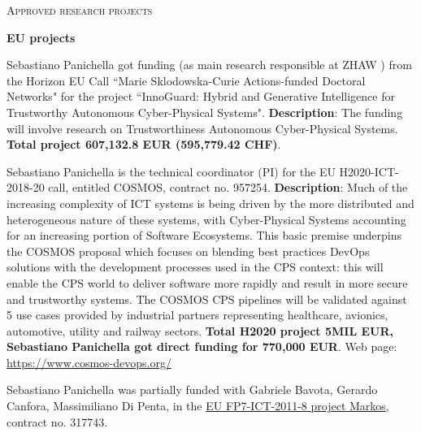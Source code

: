 \documentclass[11pt]{article}
\newcommand{\ins}[1]{\textcolor{blue}{\uline{#1}}} %
\newcommand{\ins}[1]{#1} %
\newcommand\on[1]{\nbc{ON}{#1}{red}} %
\begin{document}

\vspace{2.5mm}


\textsc{Approved research projects}
\vspace{1.5mm}


\textbf{EU projects}
\begin{innerlist}
\item 

Sebastiano Panichella got funding (as main research responsible at ZHAW ) from the Horizon EU Call ``Marie Sklodowska-Curie Actions-funded Doctoral Networks" for the project ``InnoGuard: Hybrid and Generative Intelligence for Trustworthy Autonomous Cyber-Physical Systems".
\textbf{Description}: The funding will involve research on Trustworthiness Autonomous Cyber-Physical Systems.
\textbf{Total project 607,132.8 EUR (595,779.42 CHF)}. 

\item Sebastiano Panichella is the technical coordinator (PI) for the EU H2020-ICT-2018-20 call, entitled COSMOS, contract no. 957254. \textbf{Description}: Much of the increasing complexity of ICT systems is being driven by the more distributed and heterogeneous nature of these systems, with Cyber-Physical Systems accounting for an increasing portion of Software Ecosystems. This basic premise underpins the COSMOS proposal which focuses on blending best practices DevOps solutions with the development processes used in the CPS context: this will enable the CPS world to deliver software more rapidly and result in more secure and trustworthy systems. 
The COSMOS CPS pipelines will be validated against 5 use cases provided by industrial partners representing healthcare, avionics, automotive, utility and railway sectors.  
\textbf{Total H2020 project 5MIL EUR, Sebastiano Panichella got direct funding for 770,000 EUR}. Web page: \href{https://www.cosmos-devops.org/}{https://www.cosmos-devops.org/}
   \item Sebastiano Panichella was 
    partially funded with Gabriele Bavota, Gerardo Canfora, Massimiliano Di Penta, in the \href{��http://www.markosproject.eu/��}
                   {EU FP7-ICT-2011-8 project Markos}, contract no. 317743. 
\end{innerlist}
\end{document}
